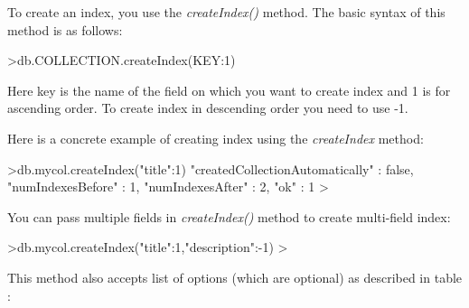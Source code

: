 \documentclass[12pt]{article}
\begin{document}
\begin{bashcode}
\begin{bashcode}
To create an index, you use the \emph{createIndex()} method.
The basic syntax of this method is as follows:

\begin{bashcode}
>db.COLLECTION.createIndex({KEY:1})
\end{bashcode}

Here key is the name of the field on which you want to create index and
1 is for ascending order. To create index in descending order you need
to use -1.

Here is a concrete example of creating index using the
\emph{createIndex} method:

\begin{bashcode}
>db.mycol.createIndex({"title":1})
{
    "createdCollectionAutomatically" : false,
    "numIndexesBefore" : 1,
    "numIndexesAfter" : 2,
    "ok" : 1
}
>
\end{bashcode}

You can pass multiple fields in \emph{createIndex()} method to create
multi-field index:

\begin{bashcode}
>db.mycol.createIndex({"title":1,"description":-1})
>
\end{bashcode}
This method also accepts list of options (which are optional) as
described in table :


\end{bashcode}
\end{bashcode}
\end{document}
